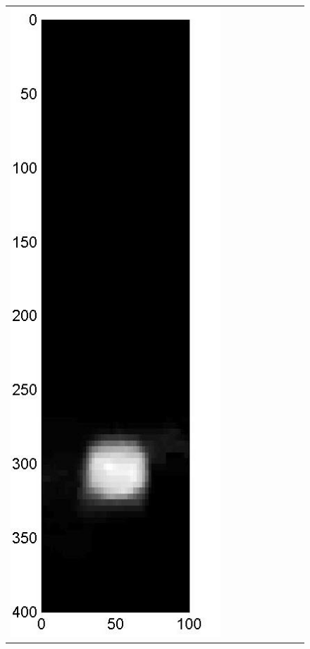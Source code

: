 \documentclass[11pt]{article}
\begin{document}
\begin{figure}[!h]
\begin{center}
\begin{tabular}{|c|c|c|c|c|c|c|c|c|}
			\includegraphics[width=.9\iwidth]{figures/newFigs/noisy/resultsExp-7-mkTV}
			&

\end{tabular}
\end{center}
\end{figure}
\end{document}
